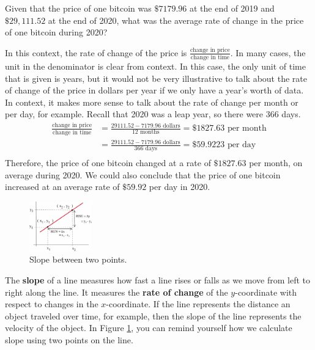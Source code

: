 \begin{example}
Given that the price of one bitcoin was $\$7179.96$ at the end of 2019 and $\$29,111.52$ at the end of 2020, what was the average rate of change in the price of one bitcoin during 2020?

\solution In this context, the rate of change of the price is $\frac{\mbox{change in price}}{\mbox{change in time}}$. In many cases, the unit in the denominator is clear from context. In this case, the only unit of time that is given is years, but it would not be very illustrative to talk about the rate of change of the price in dollars per year if we only have a year's worth of data. In context, it makes more sense to talk about the rate of change per month or per day, for example. Recall that 2020 was a leap year, so there were 366 days.
\begin{align*}
\frac{\mbox{change in price}}{\mbox{change in time}} &= \frac{29111.52 - 7179.96 \mbox{ dollars}}{12 \mbox{ months}} = \$1827.63 \mbox{ per month} \\
&= \frac{29111.52 - 7179.96 \mbox{ dollars}}{366 \mbox{ days}} = \$59.9223 \mbox{ per day} \\
\end{align*}
Therefore, the price of one bitcoin changed at a rate of $\$1827.63$ per month, on average during 2020. We could also conclude that the price of one bitcoin increased at an average rate of $\$59.92$ per day in 2020.
\end{example}

\begin{figure}
  \vspace{-20pt}
  \centering
    \includegraphics[width=0.24\textwidth]{img/chap2/image001.png}
\caption{Slope between two points.}
\label{fig:2-slope}
\vspace{-10pt}
\end{figure}
The {\bf slope} of a line measures how fast a line rises or falls as we move from left to right along the line. It measures the {\bf rate of change} of the $y$-coordinate with respect to changes in the $x$-coordinate. If the line represents the distance an object traveled over time, for example, then the slope of the line represents the velocity of the object. In Figure \ref{fig:2-slope}, you can remind yourself how we calculate slope using two points on the line.

